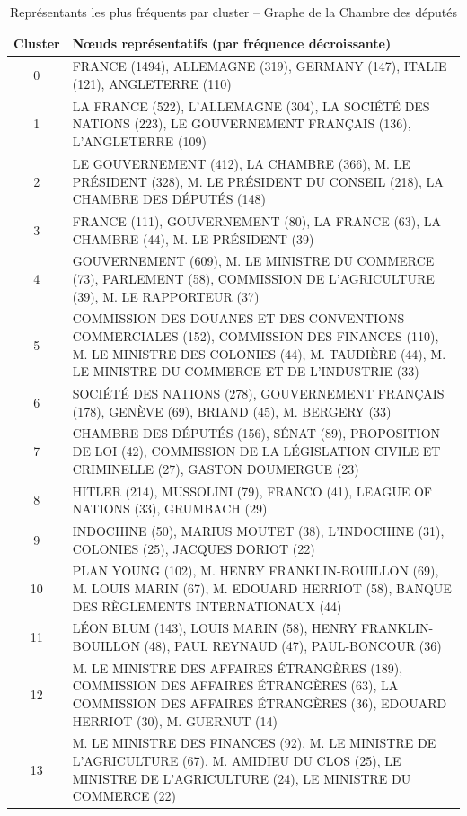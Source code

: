 \documentclass[a4paper,twoside,12pt]{book}
\begin{document}
\begin{table}[htbp]
\centering
\begin{tabular}{|c|p{12cm}|}
\hline
\textbf{Cluster} & \textbf{Nœuds représentatifs (par fréquence décroissante)} \\
\hline
0 & FRANCE (1494), ALLEMAGNE (319), GERMANY (147), ITALIE (121), ANGLETERRE (110) \\
1 & LA FRANCE (522), L'ALLEMAGNE (304), LA SOCIÉTÉ DES NATIONS (223), LE GOUVERNEMENT FRANÇAIS (136), L'ANGLETERRE (109) \\
2 & LE GOUVERNEMENT (412), LA CHAMBRE (366), M. LE PRÉSIDENT (328), M. LE PRÉSIDENT DU CONSEIL (218), LA CHAMBRE DES DÉPUTÉS (148) \\
3 & FRANCE (111), GOUVERNEMENT (80), LA FRANCE (63), LA CHAMBRE (44), M. LE PRÉSIDENT (39) \\
4 & GOUVERNEMENT (609), M. LE MINISTRE DU COMMERCE (73), PARLEMENT (58), COMMISSION DE L'AGRICULTURE (39), M. LE RAPPORTEUR (37) \\
5 & COMMISSION DES DOUANES ET DES CONVENTIONS COMMERCIALES (152), COMMISSION DES FINANCES (110), M. LE MINISTRE DES COLONIES (44), M. TAUDIÈRE (44), M. LE MINISTRE DU COMMERCE ET DE L'INDUSTRIE (33) \\
6 & SOCIÉTÉ DES NATIONS (278), GOUVERNEMENT FRANÇAIS (178), GENÈVE (69), BRIAND (45), M. BERGERY (33) \\
7 & CHAMBRE DES DÉPUTÉS (156), SÉNAT (89), PROPOSITION DE LOI (42), COMMISSION DE LA LÉGISLATION CIVILE ET CRIMINELLE (27), GASTON DOUMERGUE (23) \\
8 & HITLER (214), MUSSOLINI (79), FRANCO (41), LEAGUE OF NATIONS (33), GRUMBACH (29) \\
9 & INDOCHINE (50), MARIUS MOUTET (38), L'INDOCHINE (31), COLONIES (25), JACQUES DORIOT (22) \\
10 & PLAN YOUNG (102), M. HENRY FRANKLIN-BOUILLON (69), M. LOUIS MARIN (67), M. EDOUARD HERRIOT (58), BANQUE DES RÈGLEMENTS INTERNATIONAUX (44) \\
11 & LÉON BLUM (143), LOUIS MARIN (58), HENRY FRANKLIN-BOUILLON (48), PAUL REYNAUD (47), PAUL-BONCOUR (36) \\
12 & M. LE MINISTRE DES AFFAIRES ÉTRANGÈRES (189), COMMISSION DES AFFAIRES ÉTRANGÈRES (63), LA COMMISSION DES AFFAIRES ÉTRANGÈRES (36), EDOUARD HERRIOT (30), M. GUERNUT (14) \\
13 & M. LE MINISTRE DES FINANCES (92), M. LE MINISTRE DE L'AGRICULTURE (67), M. AMIDIEU DU CLOS (25), LE MINISTRE DE L'AGRICULTURE (24), LE MINISTRE DU COMMERCE (22) \\
\hline
\end{tabular}
\vspace{0.5em}  
\caption{Représentants les plus fréquents par cluster – Graphe de la Chambre des députés}
\label{tab:clusters-nœuds}
\end{table}
\end{document}

